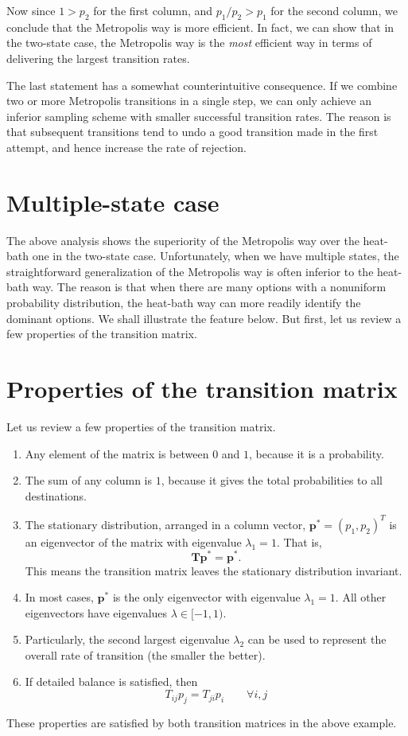 \documentclass[12pt]{article}
\begin{document}
Now since $1 > p_2$ for the first column,
and $p_1/p_2 > p_1$ for the second column,
we conclude that the Metropolis way is more efficient.
%
In fact, we can show that in the two-state case,
the Metropolis way is the \emph{most} efficient way
in terms of delivering the largest transition rates.

The last statement has a somewhat counterintuitive consequence.
If we combine two or more Metropolis transitions
in a single step, we can only achieve an inferior
sampling scheme with smaller successful transition rates.
The reason is that subsequent transitions tend to
undo a good transition made in the first attempt,
and hence increase the rate of rejection.




\section{Multiple-state case}

The above analysis shows the superiority of the Metropolis way
over the heat-bath one in the two-state case.
%
Unfortunately, when we have multiple states,
the straightforward generalization of the Metropolis way
is often inferior to the heat-bath way.
%
The reason is that when there are many options with
a nonuniform probability distribution,
the heat-bath way can more readily identify the dominant options.
%
We shall illustrate the feature below.
%
But first, let us review a few properties of the transition matrix.


\section{Properties of the transition matrix}

Let us review a few properties of the transition matrix.
%
\begin{enumerate}
  \item Any element of the matrix is between $0$ and $1$,
    because it is a probability.
  \item The sum of any column is $1$, because it
    gives the total probabilities to all destinations.
  \item The stationary distribution, arranged in a column vector,
      $\mathbf p^* = (p_1, p_2)^T$ is an eigenvector of the matrix
      with eigenvalue $\lambda_1 = 1$. That is,
      $$
      \mathbf T \mathbf p^* = \mathbf p^*.
      $$
      This means the transition matrix leaves
      the stationary distribution invariant.
  \item
      In most cases, $\mathbf p^*$ is the only eigenvector
      with eigenvalue $\lambda_1 = 1$.
      All other eigenvectors have eigenvalues $\lambda \in [-1, 1)$.
  \item
      Particularly, the second largest eigenvalue $\lambda_2$ can be used to represent
      the overall rate of transition (the smaller the better).
  \item If detailed balance is satisfied, then
      $$
      T_{ij} p_j = T_{ji} p_i
      \qquad \forall i, j
      $$
\end{enumerate}
%
These properties are satisfied by both transition matrices
in the above example.
\end{document}

